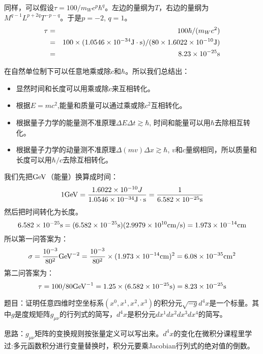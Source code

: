 \documentclass[CJK]{beamer}
\begin{document}
\begin{frame}
\bch
同样，可以假设$\tau = 100/m_W c^p \hbar^q$。左边的量纲为$T$，右边的量纲为$M^{q-1}L^{p+2q}T^{-p-q}$。于是$p=-2$, $q=1$。
\begin{eqnarray}
\tau &=& 100 \hbar/(m_Wc^2) \nonumber \\
     &=& 100 \times (1.0546\times 10^{-34} \mathrm{J\cdot s}) /(80\times 1.6022 \times 10^{-10} \mathrm{J}) \nonumber \\
     &=& 8.23 \times 10^{-25}\mathrm{s} \nonumber
\end{eqnarray}



\ech
\end{frame}

\begin{frame}
\bch
在自然单位制下可以任意地乘或除$c$和$\hbar$。所以我们总结出：
\begin{itemize}
\item{显然时间和长度可以用乘或除$c$来互相转化。}
\item{根据$E=mc^2$,能量和质量可以通过乘或除$c^2$互相转化。}
\item{根据量子力学的能量测不准原理$\Delta E\Delta t \gtrsim \hbar$, 时间和能量可以用$\hbar$去除相互转化。}
\item{根据量子力学的动量测不准原理$\Delta (mv) \Delta x \gtrsim \hbar$, $v$和$c$量纲相同，所以质量和长度可以用$\hbar/c$去除互相转化。}
\end{itemize}

\ech
\end{frame}

\begin{frame}
\bch
我们先把$\mathrm{GeV}$（能量）换算成时间：
$$ 1 \mathrm{GeV} = \frac{1.6022\times 10^{-10}J}{1.0546\times 10^{-34}\mathrm{J}\cdot\mathrm{s}} = \frac{1}{6.582\times 10^{-25}\mathrm{s}}$$
然后把时间转化为长度。
$$ 6.582\times 10^{-25}\mathrm{s} =  (6.582\times 10^{-25}\mathrm{s})  (2.9979\times 10^{10} \mathrm{cm}/\mathrm{s}) = 1.973\times 10^{-14} \mathrm{cm} $$
所以第一问答案为：
$$\sigma = \frac{10^{-3}}{80^2} \mathrm{GeV}^{-2} = \frac{10^{-3}}{80^2}\times  (1.973\times 10^{-14} \mathrm{cm})^2 = 6.08\times 10^{-35}\mathrm{cm}^2$$
第二问答案为：
$$\tau = 100/80 \mathrm{GeV}^{-1} = 1.25 \times (6.582\times 10^{-25}\mathrm{s}) = 8.23\times 10^{-25}\mathrm{s}$$
\ech
\end{frame}

\begin{frame}
\bch
题目：证明任意四维时空坐标系$(x^0, x^1, x^2, x^3)$的积分元$\sqrt{-g}d^4x$是一个标量。其中$g$是度规矩阵$g_{\mu\nu}$的行列式的简写，$d^4x$是积分元$dx^1dx^2dx^3dx^4$的简写。
\skipline

思路：$g_{\mu\nu}$矩阵的变换规则按张量定义可以写出来。$d^4x$的变化在微积分课程里学过:多元函数积分进行变量替换时，积分元要乘Jacobian行列式的绝对值的倒数。

\ech
\end{frame}
\end{document}
